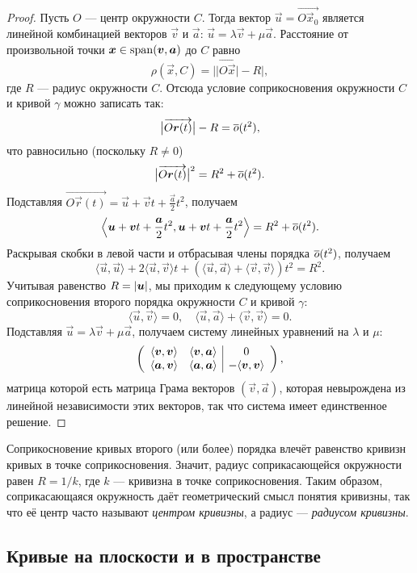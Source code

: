 \begin{proof}
	Пусть $O$ --- центр окружности $C$. Тогда вектор $\vec{u} = \overrightarrow{O\vec{x}_0}$ является линейной комбинацией векторов $\vec{v}$ и $\vec{a}$: $\vec{u} = \lambda\vec{v} + \mu\vec{a}$. Расстояние от произвольной точки $\boldsymbol{x} \in \operatorname{span}(\boldsymbol{v}, \boldsymbol{a})$ до $C$ равно
	\[
		\rho(\vec{x}, C) = \Big\lvert\big\lvert\overrightarrow{O\vec{x}}\big\rvert - R\Big\rvert,
	\]
	где $R$ --- радиус окружности $C$. Отсюда условие соприкосновения окружности $C$ и кривой $\gamma$ можно записать так:
	\[
		\big\lvert\overrightarrow{O\boldsymbol{r}(t)}\big\rvert - R = \overline{o}(t^2),
	\]
	что равносильно (поскольку $R \ne 0$)
	\[
		\big\lvert\overrightarrow{O\boldsymbol{r}(t)}\big\rvert^2 = R^2 + \overline{o}(t^2).
	\]
	Подставляя $\overrightarrow{O\vec{r}(t)} = \vec{u} + \vec{v}t + \frac{\vec{a}}{2}t^2$, получаем
	\[
		\left\langle\boldsymbol{u} + \boldsymbol{v}t + \frac{\boldsymbol{a}}{2}t^2, \boldsymbol{u} + \boldsymbol{v}t + \frac{\boldsymbol{a}}{2}t^2\right\rangle = R^2 + \overline{o}(t^2).
	\]
	Раскрывая скобки в левой части и отбрасывая члены порядка $\overline{o}(t^2)$, получаем
	\[
		\langle\vec{u}, \vec{u}\rangle + 2\langle\vec{u}, \vec{v}\rangle t + (\langle\vec{u}, \vec{a}\rangle + \langle\vec{v}, \vec{v}\rangle)t^2 = R^2.
	\]
	Учитывая равенство $R = \left\lvert\boldsymbol{u}\right\rvert$, мы приходим к следующему условию соприкосновения второго порядка окружности $C$ и кривой $\gamma$:
	\[
		\langle\vec{u}, \vec{v}\rangle = 0,\quad \langle\vec{u}, \vec{a}\rangle + \langle\vec{v}, \vec{v}\rangle = 0.
	\]
	Подставляя $\vec{u} = \lambda\vec{v} + \mu\vec{a}$, получаем систему линейных уравнений на $\lambda$ и $\mu$:
	\[
		\left(
			\begin{array}{cc | c}
				\langle\boldsymbol{v}, \boldsymbol{v}\rangle & \langle\boldsymbol{v}, \boldsymbol{a}\rangle & 0\\
				\langle\boldsymbol{a}, \boldsymbol{v}\rangle & \langle\boldsymbol{a}, \boldsymbol{a}\rangle & -\langle\boldsymbol{v}, \boldsymbol{v}\rangle
			\end{array}
		\right),
	\]
	матрица которой есть матрица Грама векторов $(\vec{v}, \vec{a})$, которая невырождена из линейной независимости этих векторов, так что система имеет единственное решение.
\end{proof}

Соприкосновение кривых второго (или более) порядка влечёт равенство кривизн кривых в точке соприкосновения. Значит, радиус соприкасающейся окружности равен $R = 1 / k$, где $k$ --- кривизна в точке соприкосновения. Таким образом, соприкасающаяся окружность даёт геометрический смысл понятия кривизны, так что её центр часто называют \textit{центром кривизны}, а радиус --- \textit{радиусом кривизны}.

\subsection{Кривые на плоскости и в пространстве}


